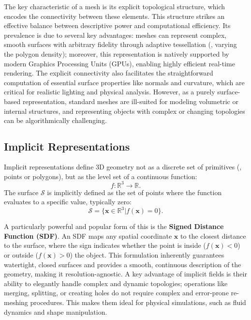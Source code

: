 The key characteristic of a mesh is its explicit topological structure, which encodes the connectivity between these elements. This structure strikes an effective balance between descriptive power and computational efficiency. Its prevalence is due to several key advantages: meshes can represent complex, smooth surfaces with arbitrary fidelity through adaptive tessellation (\ie, varying the polygon density); moreover, this representation is natively supported by modern Graphics Processing Units (GPUs), enabling highly efficient real-time rendering. The explicit connectivity also facilitates the straightforward computation of essential surface properties like normals and curvature, which are critical for realistic lighting and physical analysis. However, as a purely surface-based representation, standard meshes are ill-suited for modeling volumetric or internal structures, and representing objects with complex or changing topologies can be algorithmically challenging.








\subsection{Implicit Representations}
\label{sec:rep_3d_implicit}

Implicit representations define 3D geometry not as a discrete set of primitives (\eg, points or polygons), but as the level set of a continuous function:
\begin{equation}
f: \mathbb{R}^3 \to \mathbb{R}.
\end{equation}
The surface $\mathcal{S}$ is implicitly defined as the set of points where the function evaluates to a specific value, typically zero:
\begin{equation}
\mathcal{S} = \{\mathbf{x} \in \mathbb{R}^3 | f(\mathbf{x}) = 0\}.
\end{equation}

A particularly powerful and popular form of this is the \textbf{Signed Distance Function (SDF)}.
An SDF maps any spatial coordinate $\mathbf{x}$ to the closest distance to the surface, where the sign indicates whether the point is inside ($f(\mathbf{x}) < 0$) or outside ($f(\mathbf{x}) > 0$) the object.
This formulation inherently guarantees watertight, closed surfaces and provides a smooth, continuous description of the geometry, making it resolution-agnostic.
A key advantage of implicit fields is their ability to elegantly handle complex and dynamic topologies; operations like merging, splitting, or creating holes do not require complex and error-prone re-meshing procedures.
This makes them ideal for physical simulations, such as fluid dynamics and shape manipulation.

